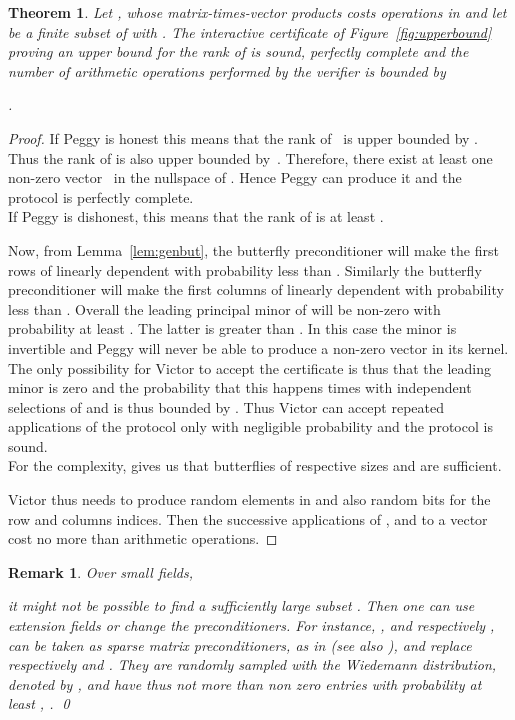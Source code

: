 \documentclass{article}
\newtheorem{theorem}{Theorem}
\newtheorem{remark}{Remark}
\begin{document}
\begin{theorem}\label{thm:upper}  
  Let , whose matrix-times-vector products costs 
  operations in  and let  be a finite subset of  with 
  .  
  The interactive certificate of Figure~\ref{fig:upperbound} proving an
  upper bound for the rank of  is sound, perfectly complete and the number of
  arithmetic operations performed by the verifier is bounded by
   
   
  .
\end{theorem}
\begin{proof}
  If Peggy is honest this means that the rank of~ is upper bounded by
  . Thus the rank of 
   is also upper bounded by~. 
  Therefore, there exist at least one non-zero vector~ in the nullspace of
  . Hence Peggy can produce it and the protocol is perfectly complete.\\
   
  If Peggy is dishonest, this means that the rank of  is at least .
   
  Now, from Lemma~\ref{lem:genbut}, 
  the butterfly preconditioner  will make the first 
  rows of  linearly dependent with probability less than
  . Similarly the butterfly preconditioner
   will make the first  columns of  linearly
  dependent with probability less  than 
  . 
  Overall the  leading principal minor of  will be non-zero
  with probability at least
  .
  The latter is greater than
  .
  In this case the minor is
  invertible and Peggy will never be able to produce a non-zero vector in its
  kernel. The only possibility for Victor to accept the certificate is thus that
  the leading minor is zero and the probability that this happens  times with
   independent selections of  and  is thus bounded by . 
  Thus Victor can accept repeated applications of the protocol only with
  negligible probability and the protocol is sound.\\
  
  For the complexity, \cite[Theorem 6.2]{Chen:2002:EMP} gives us that
  butterflies of respective sizes  and
   are sufficient. 
   
  Victor thus needs to produce
   random
  elements in  and also  random bits
  for the row and columns indices. 
  Then the successive applications of ,  and  to a vector cost no more
  than  arithmetic operations.
\end{proof}

\begin{remark}
{\upshape 
  Over small fields, 
   
  it might not be possible to find a sufficiently large subset . 
  Then one can use extension fields or change the preconditioners.
  For instance, , and respectively
  , can be taken as sparse matrix preconditioners, as in
  \cite{Wiedemann:1986:SSLE} (see also \cite[Corollary 7.3]{Chen:2002:EMP}), and
  replace respectively  and .
  They are randomly sampled with the 
  Wiedemann distribution, denoted by , and have thus not more than
   non zero entries with probability at least ,
  \cite[Theorem 1]{Wiedemann:1986:SSLE}. 
\qed} 
\end{remark}
\end{document}
